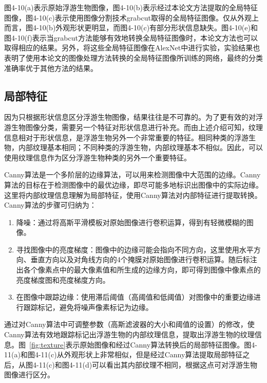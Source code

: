 图4-10(a)表示原始浮游生物图像，图4-10(b)表示经过本论文方法提取的全局特征图像，图4-10(c)表示使用图像分割技术grabcut\cite{rother2004grabcut}取得的全局特征图像。仅从外观上而言，图4-10(b)外观形状更明显，而图4-10(c)有部分形状信息缺失。图4-10(e)和图4-10(f)表示当grabcut方法能够有效地转换全局特征图像时，本论文方法也可以取得相应的结果。另外，将这些全局特征图像在AlexNet中进行实验，实验结果也表明了使用本论文的图像处理方法转换的全局特征图像所训练的网络，最终的分类准确率优于其他方法的结果。

\subsection{局部特征}

因为只根据形状信息区分浮游生物图像，结果往往是不可靠的。为了更有效的对浮游生物图像分类，需要另一个特征对形状信息进行补充。而由上述介绍可知，纹理信息相对于形状信息，是浮游生物另外一个非常重要的特征。相同种类的浮游生物，内部纹理基本相同；不同种类的浮游生物，内部纹理基本不相似。因此，可以使用纹理信息作为区分浮游生物种类的另外一个重要特征。

Canny算法\cite{canny1986computational}是一个多阶层的边缘算法，可以用来检测图像中大范围的边缘。Canny算法的目标在于检测图像中的最优边缘，即尽可能多地标识出图像中的实际边缘。这里将内部纹理信息理解为局部特征，使用Canny算法对内部特征进行提取转换。Canny算法的步骤可归纳为：
\begin{enumerate}
\item 降噪：通过将高斯平滑模板对原始图像进行卷积运算，得到有轻微模糊的图像。
\item 寻找图像中的亮度梯度：图像中的边缘可能会指向不同方向，这里使用水平方向、垂直方向以及对角线方向的4个掩膜对原始图像进行卷积运算。随后标注出各个像素点中的最大像素值和所生成的边缘方向，即可得到图像中像素点的亮度梯度图和亮度梯度方向。
\item 在图像中跟踪边缘：使用滞后阈值（高阈值和低阈值）对图像中的重要边缘进行跟踪标记，避免将噪声像素标记为边缘。
\end{enumerate}

通过对Canny算法中可调整参数（高斯滤波器的大小和阈值的设置）的修改，使Canny算法有效地跟踪标记出浮游生物的内部纹理信息，提取出浮游生物的纹理信息。图~\ref{fig:texture}表示原始图像和经过Canny算法转换后的局部特征图像。图4-11(a)和图4-11(c)从外观形状上非常相似，但是经过Canny算法提取局部特征之后，从图4-11(c)和图4-11(d)可以看出其内部纹理不相同，根据这点可对浮游生物图像进行区分。

